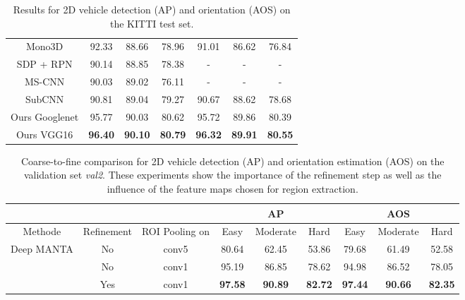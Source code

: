 \documentclass[10pt,twocolumn,letterpaper]{article}
\begin{document}
\begin{table*}[]
\begin{tabular}{c|c|c|c|l|c|c|}
\multicolumn{1}{|c|}{Mono3D \cite{mono3d} } & 92.33 & 88.66 & 78.96                      & \multicolumn{1}{c|}{91.01} & 86.62 & 76.84\\  
\multicolumn{1}{|c|}{SDP + RPN \cite{sdp}} & 90.14  & 88.85  & 78.38                       & \multicolumn{1}{c|}{-} & -  & -                       \\
\multicolumn{1}{|c|}{MS-CNN \cite{mscnn} } & 90.03 & 89.02 & 76.11                      & \multicolumn{1}{c|}{-} & - & - \\ 
\multicolumn{1}{|c|}{SubCNN \cite{subcnn} } & 90.81 & 89.04 & 79.27                      & \multicolumn{1}{c|}{90.67} & 88.62 & 78.68 \\ \hline
\multicolumn{1}{|c|}{Ours Googlenet} & 95.77 & 90.03  & 80.62                       & \multicolumn{1}{c|}{95.72} & 89.86  & 80.39                       \\
\multicolumn{1}{|c|}{Ours VGG16} & \textbf{96.40}  & \textbf{90.10}  & \textbf{80.79}                       & \multicolumn{1}{c|}{\textbf{96.32}} & \textbf{89.91}  & \textbf{80.55}                       \\

\hline

\end{tabular}
\vspace*{2mm}
\caption{Results for 2D vehicle detection (AP) and orientation (AOS) on the KITTI test set.}
\label{AP_AOS_test}
\end{table*}






\begin{table*}[]
\centering
\begin{tabular}{ccc|c|c|c|c|c|c|}
\cline{4-9}                                          &                          &     & \multicolumn{3}{c|}{AP} & \multicolumn{3}{c|}{AOS} \\ \hline
\multicolumn{1}{|c|}{Methode}             & \multicolumn{1}{c|}{Refinement} & ROI Pooling on & Easy  & Moderate & Hard & Easy  & Moderate  & Hard \\ \hline
\multicolumn{1}{|c|}{\multirow{3}{*}{Deep MANTA}} & \multicolumn{1}{c|}{No} & conv5  & 80.64 & 62.45 & 53.86 & 79.68 & 61.49 & 52.58    \\
\multicolumn{1}{|c|}{}                    & \multicolumn{1}{c|}{No} & conv1 & 95.19 & 86.85 & 78.62 & 94.98 & 86.52 & 78.05    \\ \cline{2-9} 
\multicolumn{1}{|c|}{}                    & \multicolumn{1}{c|}{Yes} & conv1  & \textbf{97.58} & \textbf{90.89} & \textbf{82.72} & \textbf{97.44} & \textbf{90.66} & \textbf{82.35}    \\ \hline
\end{tabular}
\vspace*{2mm}
\caption{Coarse-to-fine comparison for 2D vehicle detection (AP) and orientation estimation (AOS) on the validation set \textit{val2}. These experiments show the importance of the refinement step as well as the influence of the feature maps chosen for region extraction.}
\label{ctf}
\end{table*}
\end{document}
